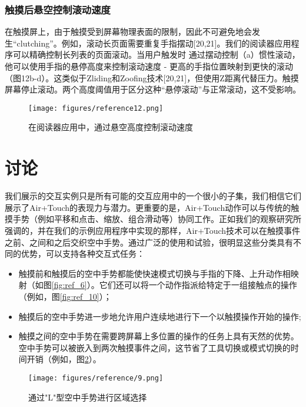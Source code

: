\subsubsection{触摸后悬空控制滚动速度}

在触摸屏上，由于触摸受到屏幕物理表面的限制，因此不可避免地会发生“clutching”。例如，滚动长页面需要重复手指摆动[20,21]。我们的阅读器应用程序可以精确控制长列表的页面滚动。当用户触发时
通过摆动控制（a）惯性滚动，他可以使用手指的悬停高度来控制滚动速度 - 更高的手指位置映射到更快的滚动（图12b-d）。这类似于Zliding和Zoofing技术[20,21]，但使用Z距离代替压力。触摸屏幕停止滚动。两个高度阈值用于区分这种“悬停滚动”与正常滚动，这不受影响。

\begin{figure}
\centering
\texttt{[image: figures/reference12.png]}
\caption{在阅读器应用中，通过悬空高度控制滚动速度}
\label{fig:ref_12}
\end{figure}

\section{讨论}

我们展示的交互实例只是所有可能的交互应用中的一个很小的子集，我们相信它们展示了Air+Touch的表现力与潜力。更重要的是，Air+Touch动作可以与传统的触摸手势（例如平移和点击、缩放、组合滑动等）协同工作。正如我们的观察研究所强调的，并在我们的示例应用程序中实现的那样，Air+Touch技术可以在触摸事件之前、之间和之后交织空中手势。通过广泛的使用和试验，很明显这些分类具有不同的优势，可以支持各种交互式任务：

\begin{itemize}
    \item 触摸前和触摸后的空中手势都能使快速模式切换与手指的下降、上升动作相映射（如图\ref{fig:ref_6}）。它们还可以将一个动作指派给特定于一组接触点的操作（例如，图\ref{fig:ref_10}）；
    
    \item 触摸后的空中手势进一步地允许用户连续地进行下一个以触摸操作开始的操作;
    
    \item 触摸之间的空中手势在需要跨屏幕上多位置的操作的任务上具有天然的优势。空中手势可以被嵌入到两次触摸事件之间，这节省了工具切换或模式切换的时间开销（例如，图\ref{fig:ref_9}）。
\end{itemize}

\begin{figure}
\centering
\texttt{[image: figures/reference/9.png]}
\caption{通过"L"型空中手势进行区域选择}
\label{fig:ref_9}
\end{figure}


